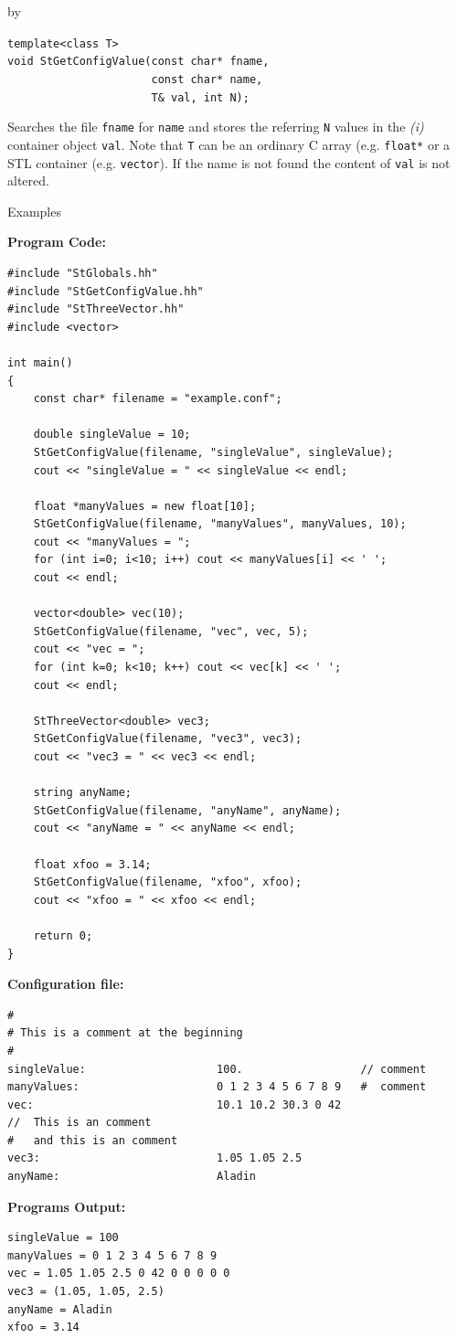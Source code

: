 \documentclass[twoside]{article}
\newcommand{\comp}[1]{\texttt{#1}}%
\newcommand{\entrylabel}[1]{\mbox{\textbf{{#1}}}\hfil}%
\newenvironment{entry}
{\begin{list}{}%
    {\renewcommand{\makelabel}{\entrylabel}%
     \setlength{\labelwidth}{90pt}%
     \setlength{\leftmargin}{\labelwidth}
     \advance\leftmargin by \labelsep%
      }%
    }%
  {\end{list}}
\newcommand{\Entrylabel}[1]%
{\raisebox{0pt}[1ex][0pt]{\makebox[\labelwidth][l]%
    {\parbox[t]{\labelwidth}{\hspace{0pt}\textbf{{#1}}}}}}
\newenvironment{Entry}%
{\renewcommand{\entrylabel}{\Entrylabel}\begin{entry}}%
  {\end{entry}}
\begin{document}
\begin{Entry}
    \verb+template<class T>+\\
    \verb+void StGetConfigValue(const char* fname,+\\
    \verb+                      const char* name,+\\
    \verb+                      T& val, int N);+
    
    Searches the file \comp{fname} for \comp{name} and stores
    the referring \comp{N} values in the {\em (i)} container object \comp{val}.
    Note that \comp{T} can be an ordinary C array (e.g. \comp{float*} or a
    STL container
    (e.g. \comp{vector}).
    If the name is not found the content of \comp{val} is not altered.

\item[Examples]
{\footnotesize
{\bf Program Code:}  
\begin{verbatim}
#include "StGlobals.hh"
#include "StGetConfigValue.hh"
#include "StThreeVector.hh"
#include <vector>

int main()
{
    const char* filename = "example.conf";

    double singleValue = 10;
    StGetConfigValue(filename, "singleValue", singleValue);
    cout << "singleValue = " << singleValue << endl;

    float *manyValues = new float[10];
    StGetConfigValue(filename, "manyValues", manyValues, 10);
    cout << "manyValues = ";
    for (int i=0; i<10; i++) cout << manyValues[i] << ' ';
    cout << endl;

    vector<double> vec(10);
    StGetConfigValue(filename, "vec", vec, 5);
    cout << "vec = ";
    for (int k=0; k<10; k++) cout << vec[k] << ' ';
    cout << endl;

    StThreeVector<double> vec3;
    StGetConfigValue(filename, "vec3", vec3);
    cout << "vec3 = " << vec3 << endl;
    
    string anyName;
    StGetConfigValue(filename, "anyName", anyName);
    cout << "anyName = " << anyName << endl;
    
    float xfoo = 3.14;
    StGetConfigValue(filename, "xfoo", xfoo);
    cout << "xfoo = " << xfoo << endl;

    return 0;
}
\end{verbatim}
{\bf Configuration file:}  
\begin{verbatim}
#
# This is a comment at the beginning
#
singleValue:                    100.                  // comment
manyValues:                     0 1 2 3 4 5 6 7 8 9   #  comment
vec:                            10.1 10.2 30.3 0 42
//  This is an comment
#   and this is an comment
vec3:                           1.05 1.05 2.5
anyName:                        Aladin
\end{verbatim}
{\bf Programs Output:}
\begin{verbatim}
singleValue = 100
manyValues = 0 1 2 3 4 5 6 7 8 9 
vec = 1.05 1.05 2.5 0 42 0 0 0 0 0 
vec3 = (1.05, 1.05, 2.5)
anyName = Aladin
xfoo = 3.14
\end{verbatim}
}   
\end{Entry}
\clearpage
\end{document}
